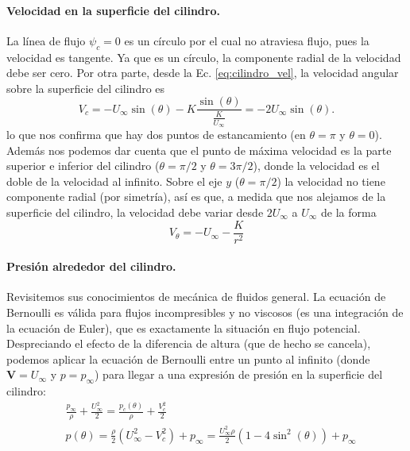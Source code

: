 \paragraph{Velocidad en la superficie del cilindro.}
La línea de flujo $\psi_c=0$ es un círculo por el cual no atraviesa flujo, pues la velocidad es tangente.
Ya que es un círculo, la componente radial de la velocidad debe ser cero.
Por otra parte, desde la Ec. \eqref{eq:cilindro_vel}, la velocidad angular sobre la superficie del cilindro es
%
\begin{equation}
V_c = -U_\infty\sin(\theta) - K\frac{\sin(\theta)}{\frac{K}{U_\infty}} = -2U_\infty\sin(\theta).
\end{equation}
%
lo que nos confirma que hay dos puntos de estancamiento (en $\theta=\pi$ y $\theta=0$).
Además nos podemos dar cuenta que el punto de máxima velocidad es la parte superior e inferior del cilindro ($\theta=\pi/2$ y $\theta=3\pi/2$), donde la velocidad es el doble de la velocidad al infinito.
Sobre el eje $y$ ($\theta=\pi/2$) la velocidad no tiene componente radial (por simetría), así es que, a medida que nos alejamos de la superficie del cilindro, la velocidad debe variar desde $2U_\infty$ a $U_\infty$ de la forma
%
\begin{equation}
V_\theta = -U_\infty - \frac{K}{r^2}
\end{equation}

\paragraph{Presión alrededor del cilindro.}

Revisitemos sus conocimientos de mecánica de fluidos general.
La ecuación de Bernoulli es válida para flujos incompresibles y no viscosos (es una integración de la ecuación de Euler), que es exactamente la situación en flujo potencial.
Despreciando el efecto de la diferencia de altura (que de hecho se cancela), podemos aplicar la ecuación de Bernoulli entre un punto al infinito (donde $\mathbf{V}=U_\infty$ y $p=p_\infty$) para llegar a una expresión de presión en la superficie del cilindro:
%
\begin{align}\label{eq:cilindro_p}
&\frac{p_\infty}{\rho} + \frac{U_\infty^2}{2} = \frac{p_c(\theta)}{\rho} + \frac{V_c^2}{2}\nonumber\\
&p(\theta) = \frac{\rho}{2}\left(U_\infty^2-V_c^2\right) + p_\infty = \frac{U_\infty^2\rho}{2}\left(1-4\sin^2(\theta)\right) + p_\infty
\end{align}

